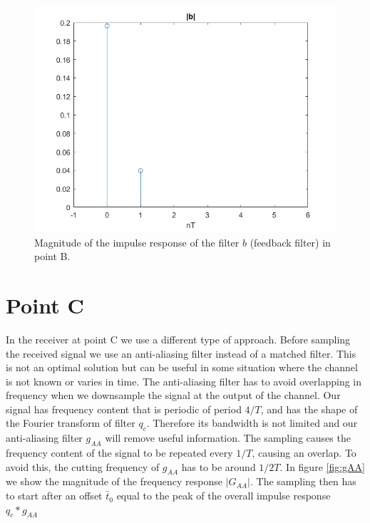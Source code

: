 \documentclass[a4paper,11.5pt]{article}
\begin{document}
\begin{figure}[ht]
	\begin{center}   
		\includegraphics[width=\textwidth]{figs/B_b.png} 
		\caption{Magnitude of the impulse response of the filter $b$ (feedback filter) in point B.}
		\label{fig:B_b}
	\end{center}
\end{figure}

\section*{Point C}

In the receiver at point C we use a different type of approach. Before sampling the received signal we use an anti-aliasing filter instead of a matched filter. This is not an optimal solution but can be useful in some situation where the channel is not known or varies in time. The anti-aliasing filter has to avoid overlapping in frequency when we downsample the signal at the output of the channel. Our signal has frequency content that is periodic of period $4/T$, and has the shape of the Fourier transform of filter $q_c$. Therefore its bandwidth is not limited and our anti-aliasing filter $g_{AA}$ will remove useful information. The sampling causes the frequency content of the signal to be repeated every $1/T$, causing an overlap. To avoid this, the cutting frequency of $g_{AA}$ has to be around $1/2T$. In figure \ref{fig:gAA} we show the magnitude of the frequency response $|G_{AA}|$.
The sampling then has to start after an offset $\bar{t}_0$ equal to the peak of the overall impulse response $q_c*g_{AA}$
\end{document}

